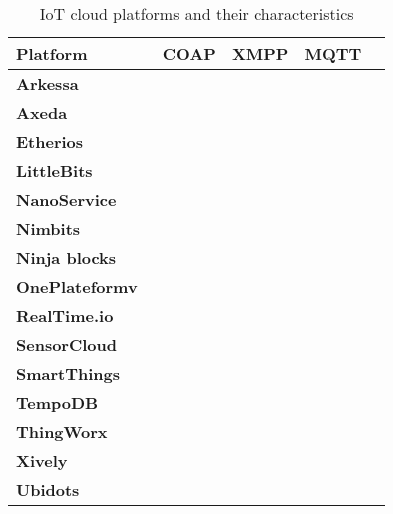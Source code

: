 \begin{table}[h!]
\begin{center}
	\begin{tabulary}{\textwidth}{L|C|C|C|C}
	\bf{Platform}      & \ \bf{COAP} & \bf{XMPP} & \bf{MQTT}\\\hline
	\bf{Arkessa}       &             &           & \ok      \\\hline
	\bf{Axeda}         &             &           &          \\\hline
	\bf{Etherios}      &             &           &          \\\hline
	\bf{LittleBits}    &             &           &          \\\hline
	\bf{NanoService}   & \ok         &           &          \\\hline
	\bf{Nimbits}       &             & \ok       &          \\\hline
	\bf{Ninja blocks}  &             &           &          \\\hline
	\bf{OnePlateformv} & \ok         & \ok       &          \\\hline
	\bf{RealTime.io}   &             &           &          \\\hline
	\bf{SensorCloud}   &             &           &          \\\hline
	\bf{SmartThings}   &             &           &          \\\hline
	\bf{TempoDB}       &             &           &          \\\hline
	\bf{ThingWorx}     &             &           & \ok      \\\hline
	\bf{Xively}        &             &           & \ok      \\\hline
	\bf{Ubidots}       &             &           & \ok      \\\hline
		\end{tabulary}
	\caption{\label{tab:IoTPlatforms} IoT cloud platforms and their characteristics}
\end{center}
\end{table}


